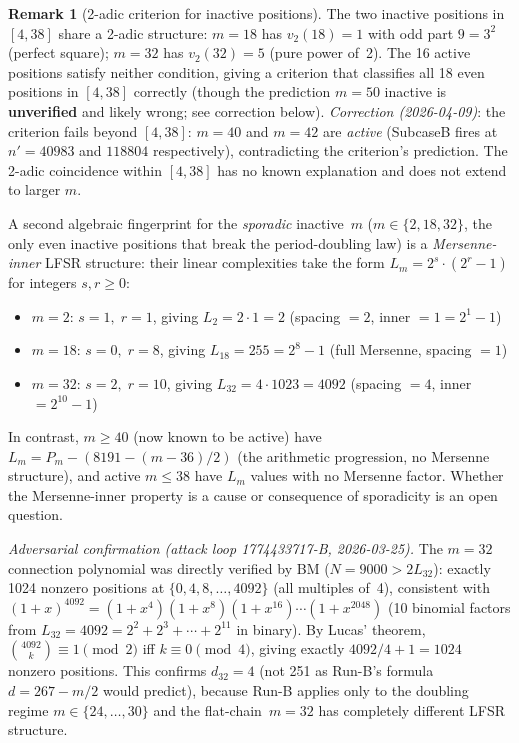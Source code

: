 \documentclass[11pt]{article}
\theoremstyle{plain}
\theoremstyle{definition}
\newtheorem{remark}[theorem]{Remark}
\begin{document}
\begin{remark}[2-adic criterion for inactive positions]
\label{rem:inactivestructure}
The two inactive positions in $[4,38]$ share a 2-adic structure:
$m=18$ has $v_2(18)=1$ with odd part $9=3^2$ (perfect square);
$m=32$ has $v_2(32)=5$ (pure power of~2).  The 16 active positions satisfy
neither condition, giving a criterion that classifies all 18 even positions
in $[4,38]$ correctly (though the prediction $m=50$ inactive is \textbf{unverified} and
likely wrong; see correction below).
\emph{Correction (2026-04-09)}: the criterion fails beyond $[4,38]$: $m=40$ and $m=42$
are \emph{active} (SubcaseB fires at $n'=40983$ and $118804$ respectively), contradicting
the criterion's prediction.  The 2-adic coincidence within $[4,38]$ has no known explanation
and does not extend to larger $m$.

A second algebraic fingerprint for the \emph{sporadic} inactive~$m$
($m \in \{2,18,32\}$, the only even inactive positions that break the period-doubling law)
is a \emph{Mersenne-inner} LFSR structure: their linear complexities take the form
$L_m = 2^s\cdot(2^r-1)$ for integers $s,r\geq 0$:
\begin{itemize}
  \item $m=2$: $s=1,\; r=1$, giving $L_2=2\cdot 1=2$ (spacing $=2$, inner $=1=2^1-1$)
  \item $m=18$: $s=0,\; r=8$, giving $L_{18}=255=2^8-1$ (full Mersenne, spacing $=1$)
  \item $m=32$: $s=2,\; r=10$, giving $L_{32}=4\cdot 1023=4092$ (spacing $=4$, inner $=2^{10}-1$)
\end{itemize}
In contrast, $m\geq 40$ (now known to be active) have $L_m = P_m - (8191-(m-36)/2)$
(the arithmetic progression, no Mersenne structure), and active $m \leq 38$ have $L_m$ values
with no Mersenne factor.  Whether the Mersenne-inner property is a cause or consequence of
sporadicity is an open question.

\emph{Adversarial confirmation (attack loop 1774433717-B, 2026-03-25).}
The $m=32$ connection polynomial was directly verified by BM ($N=9000>2L_{32}$):
exactly 1024 nonzero positions at $\{0,4,8,\ldots,4092\}$ (all multiples of~4), consistent with
$(1+x)^{4092}=(1+x^4)(1+x^8)(1+x^{16})\cdots(1+x^{2048})$ (10 binomial factors from
$L_{32}=4092=2^2+2^3+\cdots+2^{11}$ in binary).  By Lucas' theorem,
$\binom{4092}{k}\equiv 1\pmod{2}$ iff $k\equiv 0\pmod{4}$, giving exactly
$4092/4+1=1024$ nonzero positions.  This confirms $d_{32}=4$ (not 251 as Run-B's formula
$d=267-m/2$ would predict), because Run-B applies only to the doubling regime $m\in\{24,\ldots,30\}$
and the flat-chain~$m=32$ has completely different LFSR structure.
\end{remark}
\end{document}

